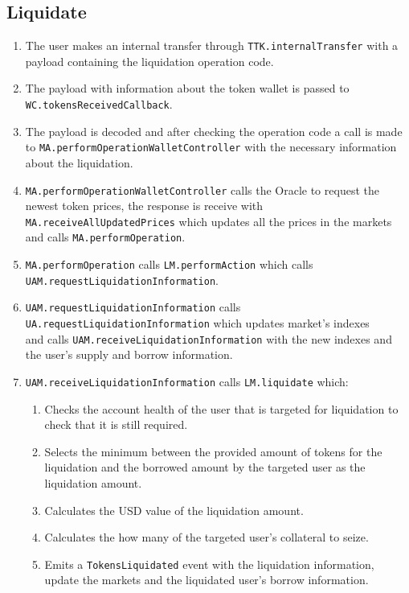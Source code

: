 \subsection{Liquidate}
\begin{enumerate}
  \item The user makes an internal transfer through \verb|TTK.internalTransfer| with a payload containing the liquidation operation code.
  \item The payload with information about the token wallet is passed to \\\verb|WC.tokensReceivedCallback|.
  \item The payload is decoded and after checking the operation code a call is made to \verb|MA.performOperationWalletController| with the necessary information about the liquidation.
  \item \verb|MA.performOperationWalletController| calls the Oracle to request the newest token prices, the response is receive with \\\verb|MA.receiveAllUpdatedPrices| which updates all the prices in the markets and calls \verb|MA.performOperation|.
  \item \verb|MA.performOperation| calls \verb|LM.performAction| which calls \\\verb|UAM.requestLiquidationInformation|.
  \item \verb|UAM.requestLiquidationInformation| calls \\\verb|UA.requestLiquidationInformation| which updates market's indexes \\and calls \verb|UAM.receiveLiquidationInformation| with the new indexes and the user's supply and borrow information.
  \item \verb|UAM.receiveLiquidationInformation| calls \verb|LM.liquidate| which:
  \begin{enumerate}
    \item Checks the account health of the user that is targeted for liquidation to check that it is still required.
    \item Selects the minimum between the provided amount of tokens for the liquidation and the borrowed amount by the targeted user as the liquidation amount.
    \item Calculates the USD value of the liquidation amount.
    \item Calculates the how many of the targeted user's collateral to seize.
    \item Emits a \verb|TokensLiquidated| event with the liquidation information, update the markets and the liquidated user's borrow information.

\end{enumerate}
\end{enumerate}
